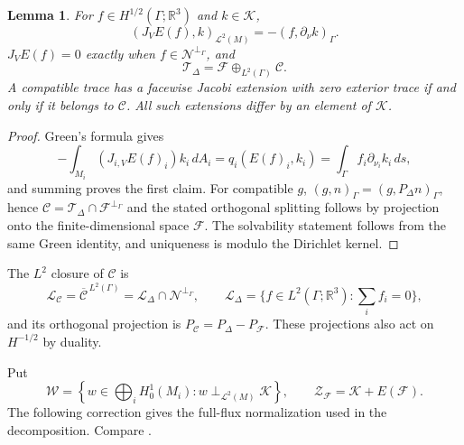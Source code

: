 \documentclass[11pt,twoside]{amsart}
\newtheorem{lem}[thm]{Lemma}
\numberwithin{equation}{section}
\begin{document}
\begin{lem}\label{lem: JE(f)=0}
For $f\in H^{1/2}(\Gamma;\mathbb R^3)$ and $k\in\mathcal K$,
\[
(J_VE(f),k)_{\mathscr L^2(M)}=-(f,\partial_\nu k)_\Gamma.
\]
$J_VE(f)=0$ exactly when $f\in\mathcal N^{\perp_\Gamma}$, and
\[
\mathcal T_\Delta=\mathcal F\oplus_{L^2(\Gamma)}\mathcal C.
\]
A compatible trace has a facewise Jacobi extension with zero exterior trace if and only if it belongs to $\mathcal C$. All such extensions differ by an element of $\mathcal K$.
\end{lem}
\begin{proof}
Green's formula gives
\[
-\int_{M_i}(J_{i,V}E(f)_i)k_i\,dA_i
=q_i(E(f)_i,k_i)=\int_\Gamma f_i\partial_{\nu_i}k_i\,ds,
\]
and summing proves the first claim. For compatible $g$, $(g,n)_\Gamma=(g,P_\Delta n)_\Gamma$, hence
$\mathcal C=\mathcal T_\Delta\cap\mathcal F^{\perp_\Gamma}$ and the stated orthogonal splitting follows by projection onto the finite-dimensional space $\mathcal F$. The solvability statement follows from the same Green identity, and uniqueness is modulo the Dirichlet kernel.
\end{proof}

The $L^2$ closure of $\mathcal C$ is
\[
\mathscr L_{\mathcal C}
=\overline{\mathcal C}^{\,L^2(\Gamma)}
=\mathscr L_\Delta\cap\mathcal N^{\perp_\Gamma},
\qquad
\mathscr L_\Delta=\{f\in L^2(\Gamma;\mathbb R^3):\sum_i f_i=0\},
\]
and its orthogonal projection is $P_{\mathcal C}=P_\Delta-P_{\mathcal F}$. These projections also act on $H^{-1/2}$ by duality.

Put
\[
\mathcal W=\left\{w\in\bigoplus_iH_0^1(M_i):w\perp_{\mathscr L^2(M)}\mathcal K\right\},
\qquad
\mathcal Z_{\mathcal F}=\mathcal K+E(\mathcal F).
\]
The following correction gives the full-flux normalization used in the decomposition. Compare \cite[Section 6.2.1, Proposition 6.13]{wang2022thesis}.
\end{document}

